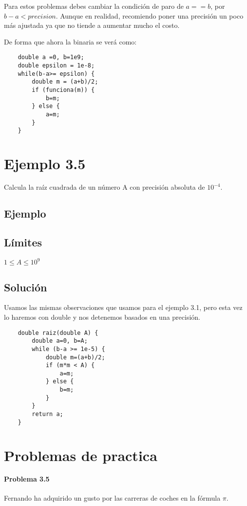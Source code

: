 Para estos problemas debes cambiar la condición de paro de \(a==b\), por \(b-a < precision\). Aunque en realidad, recomiendo poner una precisión un poco más ajustada ya que no tiende a aumentar mucho el costo.

De forma que ahora la binaria se verá como:

\begin{lstlisting}
	double a =0, b=1e9;
	double epsilon = 1e-8;
	while(b-a>= epsilon) {
		double m = (a+b)/2;
		if (funciona(m)) {
			b=m;
		} else {
			a=m;
		}
	}
\end{lstlisting}

\section*{Ejemplo 3.5}
Calcula la raíz cuadrada de un número A con precisión absoluta de \(10^{-4}\).
\subsection*{Ejemplo}
\begin{casebox2}
\end{casebox2}
\subsection*{Límites}
\begin{plimits}
	\item \(1\leq A \leq 10^9\)
\end{plimits}
\subsection*{Solución}
Usamos las mismas observaciones que usamos para el ejemplo 3.1, pero esta vez lo haremos con double y nos detenemos basados en una precisión.
\begin{lstlisting}
	double raiz(double A) {
		double a=0, b=A;
		while (b-a >= 1e-5) {
			double m=(a+b)/2;
			if (m*m < A) {
				a=m;
			} else {
				b=m;
			}
		}
		return a;
	}
\end{lstlisting}

\newpage
\section*{Problemas de practica}
\paragraph{Problema 3.5} Fernando ha adquirido un gusto por las carreras de coches en la fórmula \(\pi\).

